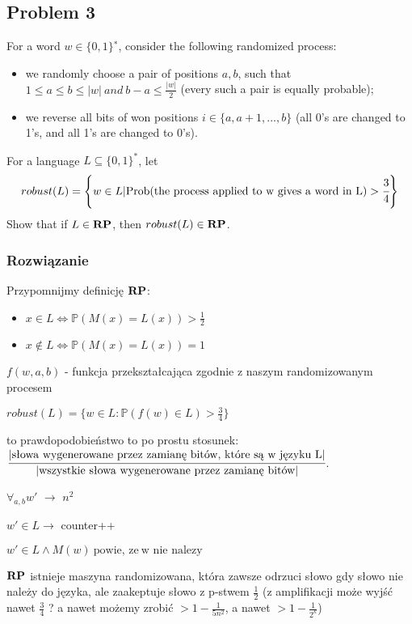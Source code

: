 \subsection{Problem 3}
For a word $w \in \{0, 1\}^∗$, consider the following randomized process:
\begin{itemize}
    \item we randomly choose a pair of positions $a, b$, such that $1 \leq a \leq b \leq |w|\ and\ b − a \leq \frac{|w|}{2}$ (every such a pair is equally probable);
    \item we reverse all bits of won positions $i \in \{a,a+1,...,b\}$ (all 0’s are changed to 1’s, and all
1’s are changed to 0’s).
\end{itemize}
For a language $L \subseteq \{0,1\}^*$, let
\[
 robust(L) = \left\{ w \in L | \textrm{Prob(the process applied to w gives a word in L)} > \cfrac{3}{4} \right\}
\]
Show that if $L \in \textbf{RP}$, then $robust(L) \in \textbf{RP}$.



\subsubsection*{Rozwiązanie}

Przypomnijmy definicję $\textbf{RP}$:

\begin{itemize}
    \item $x \in L \iff \mathbb{P}(M(x) = L(x)) > \frac{1}{2}$
    \item $x \not\in L \iff \mathbb{P}(M(x) = L(x)) = 1$
\end{itemize}

$f(w, a, b)$ - funkcja przekształcająca zgodnie z naszym randomizowanym procesem

$robust(L) = \{w \in L : \mathbb{P}(f(w) \in L) > \frac{3}{4}\}$

to prawdopodobieństwo to po prostu stosunek: $\cfrac{|\text{słowa wygenerowane przez zamianę bitów, które są w języku L}|}{|\text{wszystkie słowa wygenerowane przez zamianę bitów}|}$.

$\forall_{a, b} w'$ $\rightarrow$ $n^2$

$w' \in L \rightarrow$ counter++

$w' \in L \land M(w)\ \text{powie, ze}\ \text{w nie nalezy}$

$\textbf{RP}$ istnieje maszyna randomizowana, która zawsze odrzuci słowo gdy słowo nie należy do języka, ale zaakeptuje słowo z p-stwem $\frac{1}{2}$  (z amplifikacji może wyjść nawet $\frac{3}{4}$ ? a nawet możemy zrobić $> 1 - \frac{1}{5n^2}$, a nawet $> 1 - \frac{1}{2^k}$) 

